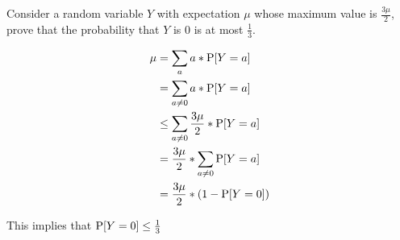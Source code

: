 \question Consider a random variable $Y$ with expectation $\mu$ whose 
maximum value is $\frac{3\mu}{2}$, prove that the probability that $Y$ 
is 0 is at most $\frac{1}{3}$. 
\begin{solution}[5cm]
\begin{equation}
\begin{split}
\mu &= \sum_a a * \P[Y=a] \\ \nonumber
&= \sum_{a\neq 0} a * \P[Y=a] \\
&\leq \sum_{a\neq 0} \frac{3 \mu}{2} * \P[Y=a]  \\
&= \frac{3 \mu}{2} * \sum_{a\neq 0} \P[Y=a]  \\
&=  \frac{3 \mu}{2} * (1 - \P[Y = 0]) 
\end{split}
\end{equation}

This implies that $\P[Y = 0] \leq \frac{1}{3}$
\end{solution}